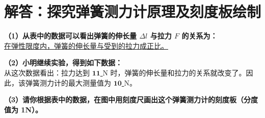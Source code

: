 

\section{解答：探究弹簧测力计原理及刻度板绘制}

\vspace{0.6cm}

\textbf{（1）从表中的数据可以看出弹簧的伸长量 $\Delta l$ 与拉力 $F$ 的关系为：}\\
\underline{\quad 在弹性限度内，弹簧的伸长量与受到的拉力成正比。\quad}

\vspace{0.4cm}

\textbf{（2）小明继续实验，得到如下数据：} \\
从这次数据看出：拉力达到 \underline{\quad $\textbf{11}$ \quad} N 时，弹簧的伸长量和拉力的关系就改变了。因此，该弹簧测力计的最大测量值为 \underline{\quad $\textbf{10}$ \quad} N。

\vspace{0.4cm}

\textbf{（3）请你根据表中的数据，在图中用刻度尺画出这个弹簧测力计的刻度板（分度值为 1N）。}

\vspace{0.4cm}

